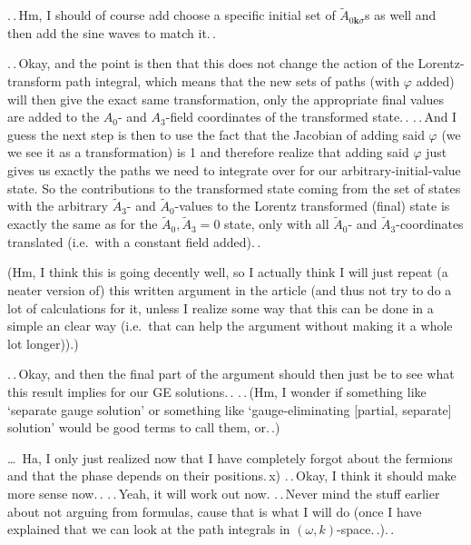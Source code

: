 \documentclass{report}
\begin{document}
.\,.\,Hm, I should of course add choose a specific initial set of $\tilde A_{0\boldsymbol{k}\sigma}$s as well and then add the sine waves to match it.\,. 

.\,.\,Okay, and the point is then that this does not change the action of the Lorentz-transform path integral, which means that the new sets of paths (with $\varphi$ added) will then give the exact same transformation, only the appropriate final values are added to the $A_0$- and $A_3$-field coordinates of the transformed state.\,. .\,.\,And I guess the next step is then to use the fact that the Jacobian of adding said $\varphi$ (we we see it as a transformation) is 1 and therefore realize that adding said $\varphi$ just gives us exactly the paths we need to integrate over for our arbitrary-initial-value state. So the contributions to the transformed state coming from the set of states with the arbitrary $\tilde A_3$- and $\tilde A_0$-values to the Lorentz transformed (final) state is exactly the same as for the $\tilde A_0, \tilde A_3=0$ state, only with all $\tilde A_0$- and $\tilde A_3$-coordinates translated (i.e.\ with a constant field added).\,. 

(Hm, I think this is going decently well, so I actually think I will just repeat (a neater version of) this written argument in the article (and thus not try to do a lot of calculations for it, unless I realize some way that this can be done in a simple an clear way (i.e.\ that can help the argument without making it a whole lot longer)).)

.\,.\,Okay, and then the final part of the argument should then just be to see what this result implies for our GE solutions.\,. .\,.\,(Hm, I wonder if something like `separate gauge solution' or something like `gauge-eliminating [partial, separate] solution' would be good terms to call them, or.\,.)


\ldots\ Ha, I only just realized now that I have completely forgot about the fermions and that the phase depends on their positions.\,x) .\,.\,Okay, I think it should make more sense now.\,. .\,.\,Yeah, it will work out now. .\,.\,Never mind the stuff earlier about not arguing from formulas, cause that is what I will do (once I have explained that we can look at the path integrals in $(\omega, k)$-space.\,.).\,. 
\end{document}

